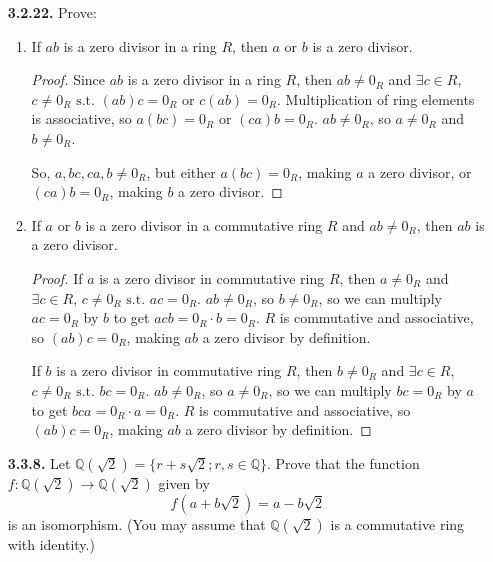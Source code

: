 \documentclass[12pt]{article}
\newcommand{\Q}{\mathbb{Q}}
\newcommand{\such}{\text{ s.t. }}
\begin{document}
\begin{itemize}
\begin{proof}
Observe that $0_{R\times S} = (0_R, 0_S)$.
Let $a \in R\times S = (r, 0_S)$ where $r \in R, r\neq 0_R$ and $b \in R\times S = (0_R, s)$ where $s \in S, s\neq 0_S$.
Observe that neither $a$ nor $b$ equals $0_{R\times S}$, but $a \odot b = (r, 0_S) \odot (0_R, s) = (0_R, 0_S) = 0_{R\times S}$.
By definition, $R\times S$ contains zero divisors: $(r, 0_S)$ and $(0_R, s)$.
\end{proof}

\item[\textbf{ 3.2.22.}] Prove:

\begin{enumerate}[(a.)]
\item If $ab$ is a zero divisor in a ring $R$, then $a$ or $b$ is a zero divisor.
\begin{proof}
Since $ab$ is a zero divisor in a ring $R$, then $ab \neq 0_R$ and $\exists c \in R$, $c \neq 0_R \such (ab)c = 0_R$ or $c(ab) = 0_R$.
Multiplication of ring elements is associative, so $a(bc) = 0_R$ or $(ca)b = 0_R$.
$ab \neq 0_R$, so $a \neq 0_R$ and $b \neq 0_R$.
\par
So, $a, bc, ca, b \neq 0_R$, but either $a(bc) = 0_R$, making $a$ a zero divisor, or $(ca)b = 0_R$, making $b$ a zero divisor.
\end{proof}


\item If $a$ or $b$ is a zero divisor in a commutative ring $R$ and $ab\ne0_R$, then $ab$ is a zero divisor.
\begin{proof}
If $a$ is a zero divisor in commutative ring $R$, then $a \neq 0_R$ and $\exists c \in R$, $c \neq 0_R \such ac = 0_R$.
$ab \neq 0_R$, so $b \neq 0_R$, so we can multiply $ac = 0_R$ by $b$ to get $acb = {0_R}\cdot b = 0_R$.
$R$ is commutative and associative, so $(ab)c = 0_R$, making $ab$ a zero divisor by definition.
\par
If $b$ is a zero divisor in commutative ring $R$, then $b \neq 0_R$ and $\exists c \in R$, $c \neq 0_R \such bc = 0_R$.
$ab \neq 0_R$, so $a \neq 0_R$, so we can multiply $bc = 0_R$ by $a$ to get $bca = {0_R}\cdot a = 0_R$.
$R$ is commutative and associative, so $(ab)c = 0_R$, making $ab$ a zero divisor by definition.


\end{proof}

\end{enumerate}

\item[\textbf{ 3.3.8.}] Let $\Q(\sqrt{2})=\{r+s\sqrt{2};r,s\in{\Q}\}$. Prove that the function $f: \Q(\sqrt{2}) \to \Q(\sqrt{2})$ given by \[f(a+b\sqrt{2})=a-b\sqrt{2}\] is an isomorphism. (You may assume that $\Q(\sqrt{2})$ is a commutative ring with identity.)


\end{itemize}
\end{document}

